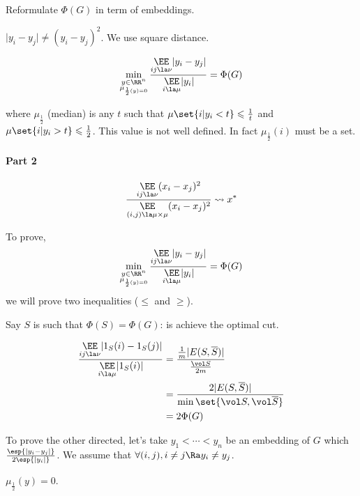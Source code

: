 \documentclass[12pt]{article}
\begin{document}
Reformulate $\Phi(G)$ in term of embeddings.


$\lvert y_i -y_j \rvert \neq (y_i-y_j)^2$. We use square distance.

\[
    \min\limits_{\substack{y\in\RR^n\\\mu_{\frac{1}{2}(y)=0}}} \frac{\underset{ij\la\nu}{\EE}\lvert y_i-y_j\rvert}{\underset{i\la\mu}{\EE}\lvert y_i \rvert} = \Phi(G)
\]

where $\mu_{\frac{1}{2}}$ (median) is any $t$ such that $\mu\set{i\vert y_i < t} \leqslant \frac{1}{t}$ and $\mu\set{i\vert y_i >t} \leqslant \frac{1}{2}$. This value is not well defined. In fact $\mu_{\frac{1}{2}}(i)$ must be a set.


\paragraph{Part 2}

\[
    \frac{\underset{ij\la\nu}{\EE}(x_i-x_j)^2}{\underset{(i,j)\la\mu\times\mu}{\EE}(x_i-x_j)^2} \rightsquigarrow x^*
\]



To prove,
\[
    \min\limits_{\substack{y\in\RR^n\\\mu_{\frac{1}{2}(y)=0}}} \frac{\underset{ij\la\nu}{\EE}\lvert y_i-y_j\rvert}{\underset{i\la\mu}{\EE}\lvert y_i \rvert} = \Phi(G)
\]
we will prove two inequalities ($\leqslant$ and $\geqslant$).


Say $S$ is such that $\Phi(S) = \Phi(G)$: is achieve the optimal cut.

\[
    \begin{aligned}
        \frac{\underset{ij\la\nu}{\EE}\lvert1_S(i)-1_S(j)\rvert}{\underset{i\la\mu}{\EE}\lvert 1_S(i)\rvert} &= \frac{\frac{1}{m}\lvert E(S,\overline{S})\rvert}{\frac{\vol S}{2m}}\\
        &= \frac{2\lvert E(S,\overline{S}) \rvert}{\min\set{\vol S, \vol \overline{S}}}\\
        &= 2 \Phi(G)
    \end{aligned}
\]

\bigskip

To prove the other directed, let's take $y_1 < \cdots < y_n$ be an embedding of $G$ which $\frac{\esp{\lvert y_i-y_j\rvert}}{2\esp{\lvert y_i \rvert}}$. We assume that $\forall (i,j), i\neq j \Ra y_i \neq y_j$.

$\mu_{\frac{1}{2}}(y) = 0$.

\end{document}
